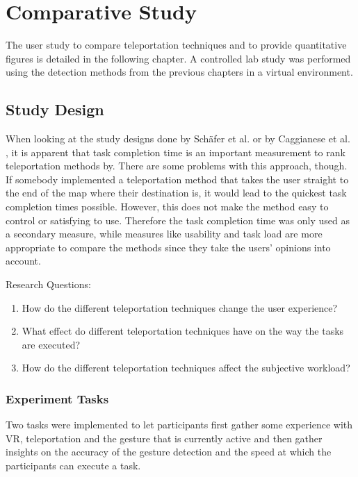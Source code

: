 \chapter{Comparative Study}
The user study to compare teleportation techniques and to provide quantitative figures is detailed in the following chapter. A controlled lab study was performed using the detection methods from the previous chapters in a virtual environment. 




\section{Study Design}
When looking at the study designs done by Schäfer et al. \cite{Schafer2021} or by Caggianese et al. \cite{Caggianese}, it is apparent that task completion time is an important measurement to rank teleportation methods by. There are some problems with this approach, though. If somebody implemented a teleportation method that takes the user straight to the end of the map where their destination is, it would lead to the quickest task completion times possible. However, this does not make the method easy to control or satisfying to use. Therefore the task completion time was only used as a secondary measure, while measures like usability and task load are more appropriate to compare the methods since they take the users' opinions into account. 

Research Questions:
\begin{enumerate}
    \item How do the different teleportation techniques change the user experience?
    \item What effect do different teleportation techniques have on the way the tasks are executed?
    \item How do the different teleportation techniques affect the subjective workload?
\end{enumerate}

\subsection{Experiment Tasks}
Two tasks were implemented to let participants first gather some experience with VR, teleportation and the gesture that is currently active and then gather insights on the accuracy of the gesture detection and the speed at which the participants can execute a task.

